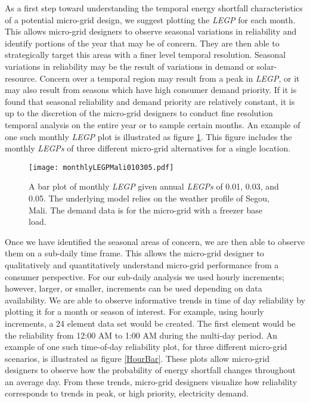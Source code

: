 \documentclass[11p]{article}
\begin{document}
As a first step toward understanding the temporal energy shortfall characteristics of a potential micro-grid design, we suggest plotting the \emph{LEGP} for each month. 
This allows micro-grid designers to observe seasonal variations in reliability and identify portions of the year that may be of concern.
They are then able to strategically target this areas with a finer level temporal resolution.
Seasonal variations in reliability may be the result of variations in demand or solar-resource.
Concern over a temporal region may result from a peak in \emph{LEGP}, or it may also result from seasons which have high consumer demand priority.
If it is found that seasonal reliability and demand priority are relatively 	
constant, it is up to the discretion of the micro-grid designers to 
conduct fine resolution temporal analysis on the entire year or to sample certain months.
An example of one such monthly \emph{LEGP} plot is illustrated as figure \ref{MonthBar}. 
This figure includes the monthly \emph{LEGPs} of three different micro-grid alternatives for a single location.
	


\begin{figure}[ht] 
  \centering
    \texttt{[image: monthlyLEGPMali010305.pdf]}
  \caption{A bar plot of monthly \emph{LEGP} given annual \emph{LEGPs} of 0.01, 0.03, and 0.05. 
  The underlying model relies on the weather profile of Segou, Mali.
  The demand data is for the micro-grid with a freezer base load. }
\label{MonthBar}
\end{figure}


Once we have identified the seasonal areas of concern, we are then able to observe them on a sub-daily time frame. 
This allows the micro-grid designer to qualitatively and quantitatively understand micro-grid performance from a consumer perspective. 
For our sub-daily analysis we used hourly increments; however, larger, or smaller, increments can be used depending on data availability.
%
%
We are able to observe informative trends in time of day reliability by plotting it for a month or season of interest. 
For example, using hourly increments, a 24 element data set would be created.
The first element would be the reliability from 12:00 AM to 1:00 AM during the multi-day period.
An example of one such time-of-day reliability plot, for three different micro-grid scenarios, is illustrated as figure \ref{HourBar}.
These plots allow micro-grid designers to observe how the probability of energy shortfall changes throughout an average day.
From these trends, micro-grid designers visualize how reliability corresponds to trends in peak, or high priority, electricity demand. 
\end{document}
